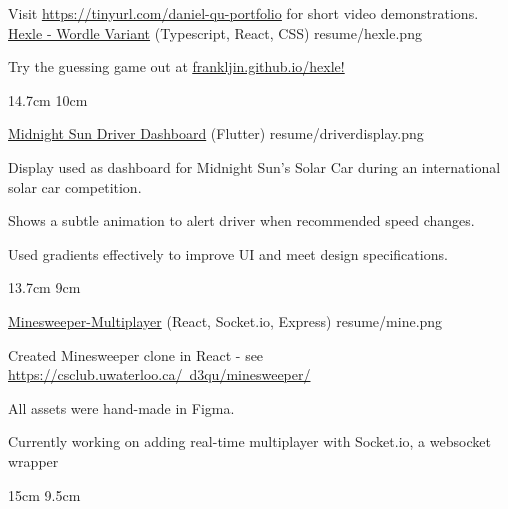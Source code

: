 

\begin{cventries}

  Visit \href{https://tinyurl.com/daniel-qu-portfolio}{\underline{https://tinyurl.com/daniel-qu-portfolio}} for short video demonstrations.
  \\%
  \portfolioEntry
    {\href{https://frankljin.github.io/hexle/}{Hexle - Wordle Variant} (Typescript, React, CSS)} %
    {resume/hexle.png} %
    {
      \begin{cvitems} %
        \item {Try the guessing game out at \href{https://frankljin.github.io/hexle/}{\underline{frankljin.github.io/hexle}!}}
      \end{cvitems}
    }
    {14.7cm}
    {10cm}

  \portfolioEntry
    {\href{https://github.com/uw-midsun/telemetry_xiv}{Midnight Sun Driver Dashboard} (Flutter)} %
    {resume/driverdisplay.png} %
    {
      \begin{cvitems} %
        \item {Display used as dashboard for Midnight Sun's Solar Car during an international solar car competition.}
        \item {Shows a subtle animation to alert driver when recommended speed changes.}
        \item {Used gradients effectively to improve UI and meet design specifications.}
      \end{cvitems}
    }
    {13.7cm}
    {9cm}

  \newpage

  \portfolioEntry
    {\href{https://csclub.uwaterloo.ca/~d3qu/minesweeper/}{Minesweeper-Multiplayer} (React, Socket.io, Express)} %
    {resume/mine.png} %
    {
      \begin{cvitems} %
        \item {Created Minesweeper clone in React - see \href{https://csclub.uwaterloo.ca/~d3qu/minesweeper/}{https://csclub.uwaterloo.ca/~d3qu/minesweeper/}}
        \item {All assets were hand-made in Figma.}
        \item {Currently working on adding real-time multiplayer with Socket.io, a websocket wrapper}
      \end{cvitems}
    }
    {15cm}
    {9.5cm}


\end{cventries}
